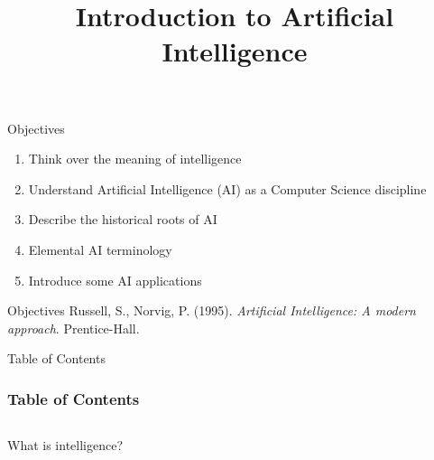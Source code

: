 \documentclass[10pt,compress]{beamer} %
\title[Introduction to Aritificial Intelligence]{Introduction to Artificial Intelligence}
\author{}
\institute{\asignatura}
\date{}
\begin{document}
{\titlepageBlue
    \begin{frame}
        \titlepage
    \end{frame}
}

\begin{frame}[plain]{}
	\begin{block}{Objectives}
		\begin{enumerate}
		\item Think over the meaning of intelligence
		\item Understand Artificial Intelligence (AI) as a Computer Science discipline
		\item Describe the historical roots of AI
		\item Elemental AI terminology
		\item Introduce some AI applications
		\end{enumerate}
	\end{block}

	\begin{block}{Objectives}
	Russell, S., Norvig, P. (1995). \textit{Artificial Intelligence: A modern approach}. Prentice-Hall.
	\end{block}
\end{frame}

{ 
\begin{frame}[shrink]{Table of Contents}
 \frametitle{Table of Contents}
 \tableofcontents
\end{frame}
}

\begin{frame}[plain]{}
	\begin{columns}
		\begin{block}{}
			\centering What is intelligence?
		\end{block}
	\end{columns}
\end{frame}
\end{document}
